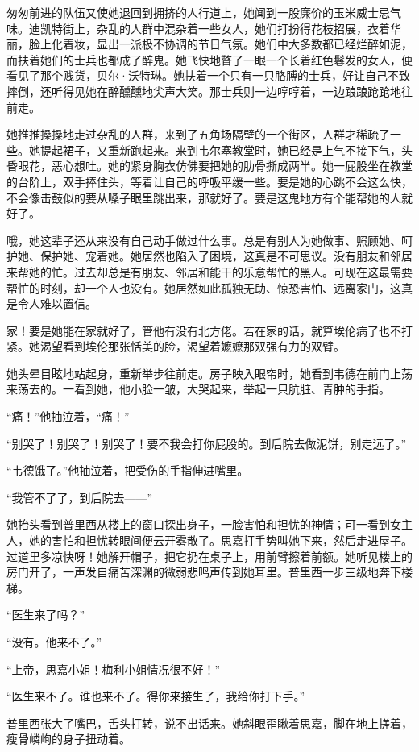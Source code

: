 \par 匆匆前进的队伍又使她退回到拥挤的人行道上，她闻到一股廉价的玉米威士忌气味。迪凯特街上，杂乱的人群中混杂着一些女人，她们打扮得花枝招展，衣着华丽，脸上化着妆，显出一派极不协调的节日气氛。她们中大多数都已经烂醉如泥，而扶着她们的士兵也都成了醉鬼。她飞快地瞥了一眼一个长着红色鬈发的女人，便看见了那个贱货，贝尔·沃特琳。她扶着一个只有一只胳膊的士兵，好让自己不致摔倒，还听得见她在醉醺醺地尖声大笑。那士兵则一边哼哼着，一边踉踉跄跄地往前走。
\par 她推推搡搡地走过杂乱的人群，来到了五角场隔壁的一个街区，人群才稀疏了一些。她提起裙子，又重新跑起来。来到韦尔塞教堂时，她已经是上气不接下气，头昏眼花，恶心想吐。她的紧身胸衣仿佛要把她的肋骨撕成两半。她一屁股坐在教堂的台阶上，双手捧住头，等着让自己的呼吸平缓一些。要是她的心跳不会这么快，不会像击鼓似的要从嗓子眼里跳出来，那就好了。要是这鬼地方有个能帮她的人就好了。
\par 哦，她这辈子还从来没有自己动手做过什么事。总是有别人为她做事、照顾她、呵护她、保护她、宠着她。她居然也陷入了困境，这真是不可思议。没有朋友和邻居来帮她的忙。过去却总是有朋友、邻居和能干的乐意帮忙的黑人。可现在这最需要帮忙的时刻，却一个人也没有。她居然如此孤独无助、惊恐害怕、远离家门，这真是令人难以置信。
\par 家！要是她能在家就好了，管他有没有北方佬。若在家的话，就算埃伦病了也不打紧。她渴望看到埃伦那张恬美的脸，渴望着嬷嬷那双强有力的双臂。
\par 她头晕目眩地站起身，重新举步往前走。房子映入眼帘时，她看到韦德在前门上荡来荡去的。一看到她，他小脸一皱，大哭起来，举起一只肮脏、青肿的手指。
\par “痛！”他抽泣着，“痛！”
\par “别哭了！别哭了！别哭了！要不我会打你屁股的。到后院去做泥饼，别走远了。”
\par “韦德饿了。”他抽泣着，把受伤的手指伸进嘴里。
\par “我管不了了，到后院去——”
\par 她抬头看到普里西从楼上的窗口探出身子，一脸害怕和担忧的神情；可一看到女主人，她的害怕和担忧转眼间便云开雾散了。思嘉打手势叫她下来，然后走进屋子。过道里多凉快呀！她解开帽子，把它扔在桌子上，用前臂擦着前额。她听见楼上的房门开了，一声发自痛苦深渊的微弱悲鸣声传到她耳里。普里西一步三级地奔下楼梯。
\par “医生来了吗？”
\par “没有。他来不了。”
\par “上帝，思嘉小姐！梅利小姐情况很不好！”
\par “医生来不了。谁也来不了。得你来接生了，我给你打下手。”
\par 普里西张大了嘴巴，舌头打转，说不出话来。她斜眼歪瞅着思嘉，脚在地上搓着，瘦骨嶙峋的身子扭动着。
